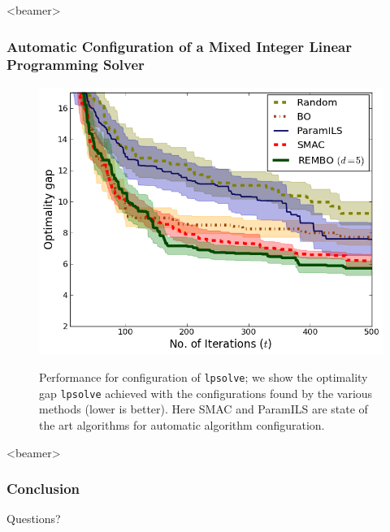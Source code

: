 \documentclass[grey]{beamer}
\begin{document}
 
 \begin{frame}<beamer>
 \frametitle{Automatic Configuration of a Mixed Integer
Linear Programming Solver}
  \begin{figure}[h!]
   \begin{center}
     \includegraphics[scale=0.35]{../paper/figures/lpsolve.png}\\
     \caption{Performance for configuration of \texttt{lpsolve}; we show the optimality gap \texttt{lpsolve} achieved with the configurations found by the various methods (lower is better). Here SMAC and ParamILS are state of the art algorithms for automatic algorithm configuration.}
   \label{fig:lpsolve}
   \end{center}
   \vspace*{-3mm}
  \end{figure}
 \end{frame}
 
 \begin{frame}<beamer>
 \frametitle{Conclusion}
  \begin{center}
  \huge
    Questions?
  \end{center}
 \end{frame}
 
\end{document}
